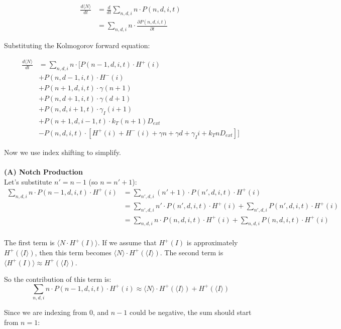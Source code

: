 \documentclass{article}
\begin{document}
\begin{flushleft}
\begin{align*}
\frac{d\langle N \rangle}{dt} &= \frac{d}{dt}\sum_{n,d,i} n \cdot P(n,d,i,t) \\
&= \sum_{n,d,i} n \cdot \frac{\partial P(n,d,i,t)}{\partial t}
\end{align*}

Substituting the Kolmogorov forward equation:

\begin{align*}
\frac{d\langle N \rangle}{dt} &= \sum_{n,d,i} n \cdot \Big[ P(n-1,d,i,t) \cdot H^+(i) \\
&+ P(n,d-1,i,t) \cdot H^-(i) \\
&+ P(n+1,d,i,t) \cdot \gamma(n+1) \\
&+ P(n,d+1,i,t) \cdot \gamma(d+1) \\
&+ P(n,d,i+1,t) \cdot \gamma_I(i+1) \\
&+ P(n+1,d,i-1,t) \cdot k_T(n+1)D_{ext} \\
&- P(n,d,i,t) \cdot [H^+(i) + H^-(i) + \gamma n + \gamma d + \gamma_I i + k_T n D_{ext}] \Big]
\end{align*}

Now we use index shifting to simplify.\\~\\

\textbf{(A) Notch Production} \\
Let's substitute $n' = n-1$ (so $n = n'+1$):
\begin{align*}
\sum_{n,d,i} n \cdot P(n-1,d,i,t) \cdot H^+(i) &= \sum_{n',d,i} (n'+1) \cdot P(n',d,i,t) \cdot H^+(i) \\
&= \sum_{n',d,i} n' \cdot P(n',d,i,t) \cdot H^+(i) + \sum_{n',d,i} P(n',d,i,t) \cdot H^+(i) \\
&= \sum_{n,d,i} n \cdot P(n,d,i,t) \cdot H^+(i) + \sum_{n,d,i} P(n,d,i,t) \cdot H^+(i) \\
\end{align*}

The first term is $\langle N \cdot H^+(I) \rangle$. If we assume that $H^+(I)$ is approximately $H^+(\langle I \rangle)$, then this term becomes $\langle N \rangle \cdot H^+(\langle I \rangle)$. The second term is $\langle H^+(I) \rangle \approx H^+(\langle I \rangle)$. 

So the contribution of this term is:
\[
\sum_{n,d,i} n \cdot P(n-1,d,i,t) \cdot H^+(i) \approx \langle N \rangle \cdot H^+(\langle I \rangle) + H^+(\langle I \rangle)
\]

Since we are indexing from 0, and $n-1$ could be negative, the sum should start from $n=1$:


\end{flushleft}
\end{document}

